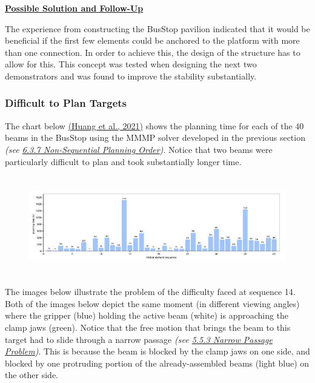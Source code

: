 \documentclass[11pt]{book}
\begin{document}
\textbf{\uline{Possible Solution and Follow-Up}}

The experience from constructing the BusStop pavilion indicated that it would be beneficial if the first few elements could be anchored to the platform with more than one connection. In order to achieve this, the design of the structure has to allow for this. This concept was tested when designing the next two demonstrators and was found to improve the stability substantially.

\subsubsection{Difficult to Plan Targets}

The chart below  \href{https://www.zotero.org/google-docs/?U91Ddz}{(Huang et al., 2021)} shows the planning time for each of the 40 beams in the BusStop using the MMMP solver developed in the previous section \textit{\textcolor[HTML]{B7B7B7}{(see \uline{6.3.7 Non-Sequential Planning Order})}}. Notice that two beams were particularly difficult to plan and took substantially longer time. 

\begin{figure}[H]
\includegraphics[width=15.92cm,height=4.3cm]{./images/image84.jpeg}
\end{figure}


The images below illustrate the problem of the difficulty faced at sequence 14. Both of the images below depict the same moment (in different viewing angles) where the gripper (blue) holding the active beam (white) is approaching the clamp jaws (green). Notice that the free motion that brings the beam to this target had to slide through a narrow passage \textit{\textcolor[HTML]{B7B7B7}{(see \uline{5.5.3 Narrow Passage Problem})}}. This is because the beam is blocked by the clamp jaws on one side, and blocked by one protruding portion of the already-assembled beams (light blue) on the other side.
\end{document}
